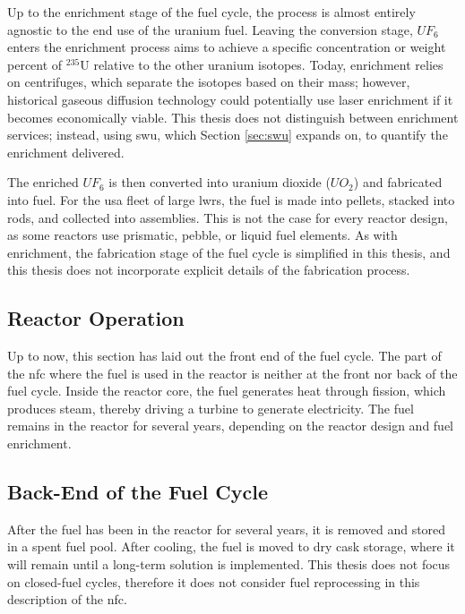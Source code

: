 Up to the enrichment stage of the fuel cycle, the process is almost entirely
agnostic to the end use of the uranium fuel. Leaving the conversion stage,
$UF_6$ enters the enrichment process aims to achieve a specific concentration
or weight percent of $^{235}$U relative to the other uranium isotopes. Today,
enrichment relies on centrifuges, which separate the isotopes based on their
mass; however, historical gaseous diffusion technology could potentially use
laser enrichment if it becomes economically viable. This thesis does not
distinguish between enrichment services; instead, using \gls{swu}, which Section
\ref{sec:swu} expands on, to quantify the enrichment delivered.

The enriched $UF_6$ is then converted into uranium dioxide ($UO_2$) and
fabricated into fuel. For the \gls{usa} fleet of large \glspl{lwr}, the fuel is made into pellets, stacked into rods, and collected into assemblies. This is not the case for every reactor design, as some reactors use prismatic, pebble, or liquid fuel elements. As with enrichment, the fabrication stage of the fuel cycle is simplified in this thesis, and this thesis does not incorporate explicit details of the fabrication process.

\subsection{Reactor Operation}
\label{sec:reactor_operation}
Up to now, this section has laid out the front end of the fuel cycle. The part of the \gls{nfc} where the fuel is used in the reactor is neither at the front nor back of the fuel cycle. Inside the reactor core, the fuel generates heat through fission, which produces steam, thereby driving a turbine to generate electricity. The fuel remains in the reactor for several years, depending on the reactor design and fuel enrichment. %


\subsection{Back-End of the Fuel Cycle}
\label{sec:back_end}
After the fuel has been in the reactor for several years, it is removed and
stored in a spent fuel pool. After cooling, the fuel is moved to dry cask
storage, where it will remain until a long-term solution is implemented.
This thesis does not focus on closed-fuel cycles, therefore it does not consider fuel reprocessing in this description of the \gls{nfc}.

